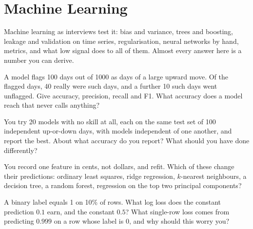 \chapter{Machine Learning}\label{ch:iv1:machine-learning}

\begin{ivtrains}
Machine learning as interviews test it: bias and variance, trees and boosting, leakage and validation on time series, regularisation, neural networks by hand, metrics, and what low signal does to all of them. Almost every answer here is a number you can derive.
\end{ivtrains}

\begin{question}\label{iq:iv1:machine-learning:1}
A model flags 100 days out of 1000 as days of a large upward move. Of the flagged days, 40 really were such days, and a further 10 such days went unflagged. Give accuracy, precision, recall and F1. What accuracy does a model reach that never calls anything?
\end{question}

\begin{question}\label{iq:iv1:machine-learning:2}
You try 20 models with no skill at all, each on the same test set of 100 independent up-or-down days, with models independent of one another, and report the best. About what accuracy do you report? What should you have done differently?
\end{question}

\begin{question}\label{iq:iv1:machine-learning:3}
You record one feature in cents, not dollars, and refit. Which of these change their predictions: ordinary least squares, ridge regression, $k$-nearest neighbours, a decision tree, a random forest, regression on the top two principal components?
\end{question}

\begin{question}\label{iq:iv1:machine-learning:4}
A binary label equals 1 on 10\% of rows. What log loss does the constant prediction $0.1$ earn, and the constant $0.5$? What single-row loss comes from predicting $0.999$ on a row whose label is 0, and why should this worry you?
\end{question}

